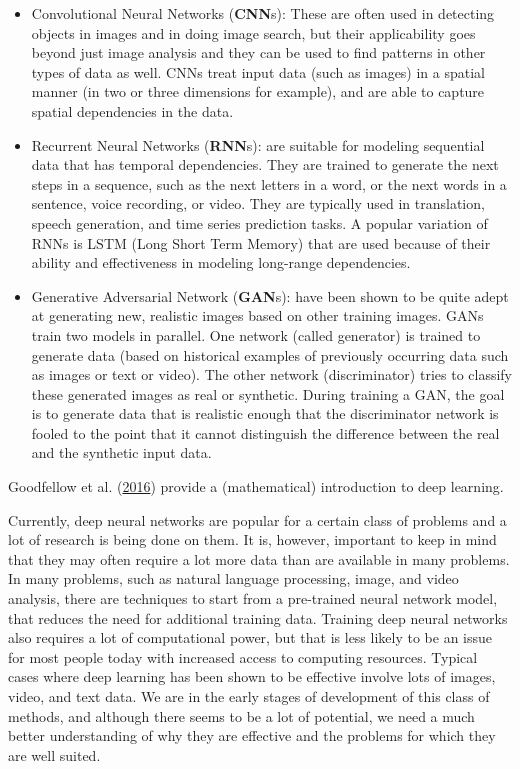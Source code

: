 \documentclass[]{krantz}
\begin{document}
\begin{itemize}
\item
  Convolutional Neural Networks (\textbf{CNN}s): These are often used in
  detecting objects in images and in doing image search, but their
  applicability goes beyond just image analysis and they can be used to
  find patterns in other types of data as well. CNNs treat input data
  (such as images) in a spatial manner (in two or three dimensions for
  example), and are able to capture spatial dependencies in the data.
\item
  Recurrent Neural Networks (\textbf{RNN}s): are suitable for modeling
  sequential data that has temporal dependencies. They are trained to
  generate the next steps in a sequence, such as the next letters in a
  word, or the next words in a sentence, voice recording, or video. They
  are typically used in translation, speech generation, and time series
  prediction tasks. A popular variation of RNNs is LSTM (Long Short Term
  Memory) that are used because of their ability and effectiveness in
  modeling long-range dependencies.
\item
  Generative Adversarial Network (\textbf{GAN}s): have been shown to be
  quite adept at generating new, realistic images based on other
  training images. GANs train two models in parallel. One network
  (called generator) is trained to generate data (based on historical
  examples of previously occurring data such as images or text or
  video). The other network (discriminator) tries to classify these
  generated images as real or synthetic. During training a GAN, the goal
  is to generate data that is realistic enough that the discriminator
  network is fooled to the point that it cannot distinguish the
  difference between the real and the synthetic input data.
\end{itemize}

Goodfellow et al. (\protect\hyperlink{ref-Goodfellow2016}{2016}) provide
a (mathematical) introduction to deep learning.

Currently, deep neural networks are popular for a certain class of
problems and a lot of research is being done on them. It is, however,
important to keep in mind that they may often require a lot more data
than are available in many problems. In many problems, such as natural
language processing, image, and video analysis, there are techniques to
start from a pre-trained neural network model, that reduces the need for
additional training data. Training deep neural networks also requires a
lot of computational power, but that is less likely to be an issue for
most people today with increased access to computing resources. Typical
cases where deep learning has been shown to be effective involve lots of
images, video, and text data. We are in the early stages of development
of this class of methods, and although there seems to be a lot of
potential, we need a much better understanding of why they are effective
and the problems for which they are well suited.
\end{document}
